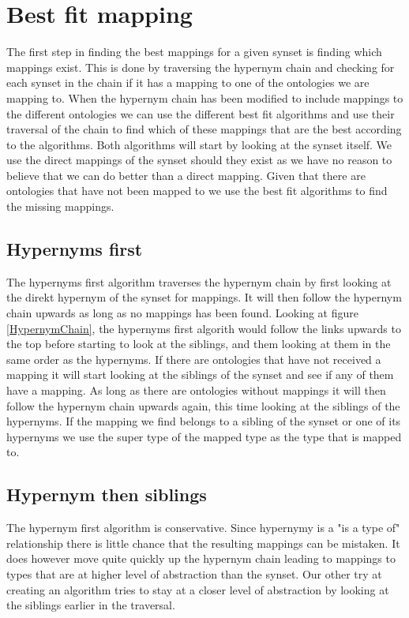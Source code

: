 \section{Best fit mapping}
\label{BestFitMapping}
The first step in finding the best mappings for a given synset is finding which mappings exist.
This is done by traversing the hypernym chain and checking for each synset in the chain if it has a mapping to
one of the ontologies we are mapping to.
When the hypernym chain has been modified to include mappings to the different ontologies we can use the different
best fit algorithms and use their traversal of the chain to find which of these mappings that are the best according to
the algorithms.
Both algorithms will start by looking at the synset itself.
We use the direct mappings of the synset should they exist as we have no reason to believe that we can do better than a
direct mapping.
Given that there are ontologies that have not been mapped to we use the best fit algorithms to find the missing mappings.

\subsection{Hypernyms first}
The hypernyms first algorithm traverses the hypernym chain by first looking at the direkt hypernym of the synset for mappings.
It will then follow the hypernym chain upwards as long as no mappings has been found.
Looking at figure \ref{HypernymChain}, the hypernyms first algorith would follow the links upwards to the top before
starting to look at the siblings, and them looking at them in the same order as the hypernyms.
If there are ontologies that have not received a mapping it will start looking at the siblings of the synset and see
if any of them have a mapping.
As long as there are ontologies without mappings it will then follow the hypernym chain upwards again,
this time looking at the siblings of the hypernyms.
If the mapping we find belongs to a sibling of the synset or one of its hypernyms we use the super type of the mapped
type as the type that is mapped to.

\subsection{Hypernym then siblings}
The hypernym first algorithm is conservative.
Since hypernymy is a "is a type of" relationship there is little chance that the resulting mappings can be mistaken.
It does however move quite quickly up the hypernym chain leading to mappings to types that are at higher level
of abstraction than the synset.
Our other try at creating an algorithm tries to stay at a closer level of abstraction by looking at the siblings earlier
in the traversal.

